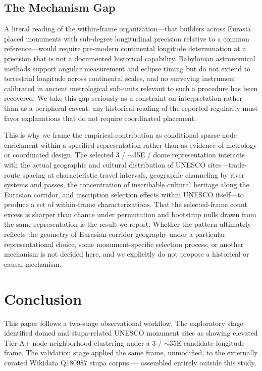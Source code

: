 \subsection{The Mechanism Gap}
\label{sec:mechanism}

A literal reading of the within-frame organization---that builders
across Eurasia placed monuments with sub-degree longitudinal precision
relative to a common reference---would require pre-modern continental
longitude determination at a precision that is not a documented
historical capability. Babylonian astronomical methods support angular
measurement and eclipse timing
\citep{hunger2019mul,neugebauer1975history,robson2008mathematics} but
do not extend to terrestrial longitude across continental scales, and
no surveying instrument calibrated in ancient metrological sub-units
relevant to such a procedure has been recovered. We take this gap
seriously as a constraint on interpretation rather than as a
peripheral caveat: any historical reading of the reported regularity
must favor explanations that do not require coordinated placement.

This is why we frame the empirical contribution as conditional
sparse-node enrichment within a specified representation rather than
as evidence of metrology or coordinated design. The selected
3\textdegree{} / $\sim$35\textdegree{}E / dome representation interacts with the actual
geographic and cultural distribution of UNESCO sites---trade-route
spacing at characteristic travel intervals, geographic channeling by
river systems and passes, the concentration of inscribable cultural
heritage along the Eurasian corridor, and inscription selection
effects within UNESCO itself---to produce a set of within-frame
characterizations. That the selected-frame count excess is sharper
than chance under permutation and bootstrap nulls drawn from the same
representation is the result we report. Whether the pattern
ultimately reflects the geometry of Eurasian corridor geography under
a particular representational choice, some monument-specific
selection process, or another mechanism is not decided here, and we
explicitly do not propose a historical or causal mechanism.


\section{Conclusion}

This paper follows a two-stage observational workflow. The exploratory
stage identified domed and stupa-related UNESCO monument sites as showing
elevated Tier-A+ node-neighborhood clustering under a
3\textdegree{} / $\sim$35\textdegree{}E candidate longitude frame.
The validation stage applied the same frame, unmodified, to the
externally curated Wikidata Q180987 stupa corpus --- assembled entirely
outside this study.

